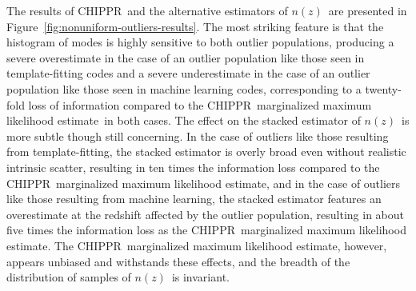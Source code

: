 \documentclass[iop]{emulateapj}
\newcommand{\Fig}[1]{Figure~\ref{#1}}
\newcommand{\project}[1]{{\textsc{#1}}}
\newcommand{\Chippr}{\project{CHIPPR}}
\newcommand{\nz}{$n(z)$}
\newcommand{\mmle}{marginalized maximum likelihood estimate}
\begin{document}
The results of \Chippr\ and the alternative estimators of \nz\ are presented in \Fig{fig:nonuniform-outliers-results}.
The most striking feature is that the histogram of modes is highly sensitive to both outlier populations, producing a severe overestimate in the case of an outlier population like those seen in template-fitting codes and a severe underestimate in the case of an outlier population like those seen in machine learning codes, corresponding to a twenty-fold loss of information compared to the \Chippr\ \mmle\ in both cases.
The effect on the stacked estimator of \nz\ is more subtle though still concerning.
In the case of outliers like those resulting from template-fitting, the stacked estimator is overly broad even without realistic intrinsic scatter, resulting in ten times the information loss compared to the \Chippr\ \mmle, and in the case of outliers like those resulting from machine learning, the stacked estimator features an overestimate at the redshift affected by the outlier population, resulting in about five times the information loss as the \Chippr\ \mmle.
The \Chippr\ \mmle, however, appears unbiased and withstands these effects, and the breadth of the distribution of samples of \nz\ is invariant.
\end{document}
